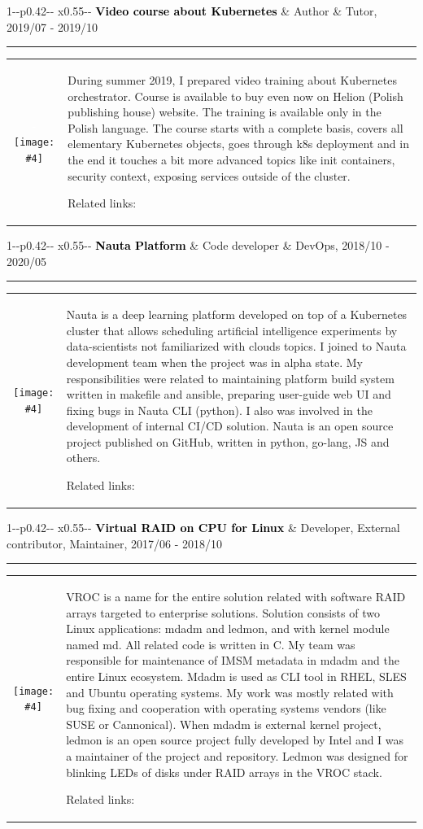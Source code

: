 \documentclass[11pt,A4]{article}
\newcommand{\mpwidth}{\linewidth-\fboxsep-\fboxsep}
\newcommand{\portfolioitem}[8]
{
\medskip\medskip
\vspace{8pt}
	\begin{tabular*}{1\mpwidth}{p{0.42\mpwidth}  x{0.55\mpwidth}}
 	\textcolor{black}{\textbf{#2}} & \textcolor{complcol}{#3}, \textcolor{bgcol}{#1}

	\end{tabular*}
\vspace{-12pt}
\textcolor{softcol}{\hrule}
\vspace{5pt}
  \begin{tabular}{ c m{13cm} }
    \begin{minipage}{.3\textwidth}
         \textcolor{white}{#8}\texttt{[image: \#4]}
    \end{minipage}
    & #6

Related links: #7 \\
  \end{tabular}
}
\newcommand{\portfoliohref}[2]{
\href[pdfnewwindow=true]{#1}{\color{complcol}{#2}}
}
\begin{document}
\portfolioitem{2019/07 - 2019/10}{Video course about Kubernetes}{Author \& Tutor}{img/helion.png}{1.0}
{During summer 2019, I prepared video training about Kubernetes orchestrator. Course is available to buy even now on Helion (Polish publishing house) website. The training is available only in the Polish language. The course starts with a complete basis, covers all elementary Kubernetes objects, goes through k8s deployment and in the end it touches a bit more advanced topics like init containers, security context, exposing services outside of the cluster.}
{\portfoliohref{https://helion.pl/ksiazki/kubernetes-kurs-video-wdrazanie-aplikacji-michal-zylowski,vuruap.htm}{My kubernetes training [PL]}}{-}

\portfolioitem{2018/10 - 2020/05}{Nauta Platform}{Code developer \& DevOps}{img/nauta.png}{1.1}
{Nauta is a deep learning platform developed on top of a Kubernetes cluster that allows scheduling artificial intelligence experiments by data-scientists not familiarized with clouds topics. I joined to Nauta development team when the project was in alpha state. My responsibilities were related to maintaining platform build system written in makefile and ansible, preparing user-guide web UI and fixing bugs in Nauta CLI (python). I also was involved in the development of internal CI/CD solution. Nauta is an open source project published on GitHub, written in python, go-lang, JS and others.}
{\portfoliohref{https://github.com/IntelAI/nauta/commit/7efbdac3e9cc4d64afd6b6e6fb0481e2b2436ff9}{UI component} | \portfoliohref{https://github.com/IntelAI/nauta/commit/c4ecc8a44ba212516ec4dd2f9a4bf830ed589701}{Build system change} | \portfoliohref{https://github.com/IntelAI/nauta/commit/abde914c1eccf2612774e67646564a2f61caa44e}{Nauta CLI change}}{}

\portfolioitem{2017/06 - 2018/10}{Virtual RAID on CPU for Linux}{Developer, External contributor, Maintainer}{img/vroc.jpg}{1.0}
{VROC is a name for the entire solution related with software RAID arrays targeted to enterprise solutions. Solution consists of two Linux applications: mdadm and ledmon, and with kernel module named md. All related code is written in C. My team was responsible for maintenance of IMSM metadata in mdadm and the entire Linux ecosystem. Mdadm is used as CLI tool in RHEL, SLES and Ubuntu operating systems. My work was mostly related with bug fixing and cooperation with operating systems vendors (like SUSE or Cannonical). When mdadm is external kernel project, ledmon is an open source project fully developed by Intel and I was a maintainer of the project and repository. Ledmon was designed for blinking LEDs of disks under RAID arrays in the VROC stack.}
{\portfoliohref{https://github.com/intel/ledmon/commits?author=mzylowski}{My ledmon commits} | \portfoliohref{https://git.kernel.org/pub/scm/linux/kernel/git/torvalds/linux.git/commit/scripts/checkpatch.pl?id=6ad724e2a48fc24dd9788490d85a3490cb0117c1}{Kernel patch} | \portfoliohref{https://git.kernel.org/pub/scm/utils/mdadm/mdadm.git/log/?qt=grep\&q=Michal+Zylowski}{My mdadm patches}}{}
\end{document}
